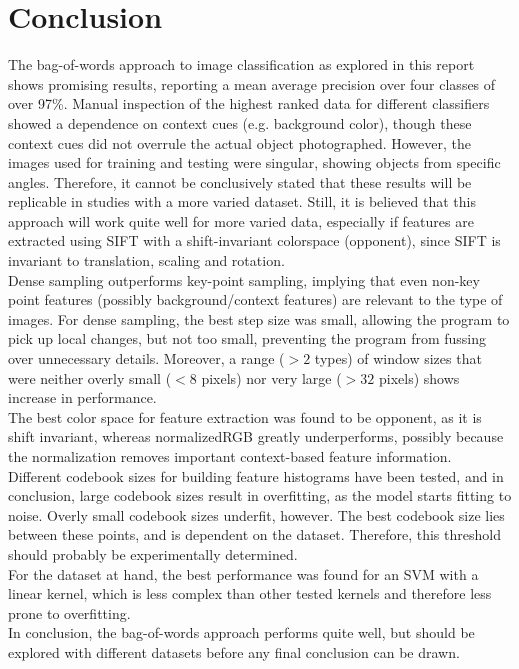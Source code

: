 \documentclass{article} %
\begin{document}
\section{Conclusion}
The bag-of-words approach to image classification as explored in this report shows promising results, reporting a mean average precision over four classes of over 97\%. Manual inspection of the highest ranked data for different classifiers showed a dependence on context cues (e.g. background color), though these context cues did not overrule the actual object photographed. However, the images used for training and testing were singular, showing objects from specific angles. Therefore, it cannot be conclusively stated that these results will be replicable in studies with a more varied dataset. Still, it is believed that this approach will work quite well for more varied data, especially if features are extracted using SIFT with a shift-invariant colorspace (opponent), since SIFT is invariant to translation, scaling and rotation. \\
Dense sampling outperforms key-point sampling, implying that even non-key point features (possibly background/context features) are relevant to the type of images. For dense sampling, the best step size was small, allowing the program to pick up local changes, but not too small, preventing the program from fussing over unnecessary details. Moreover, a range ($>2$ types) of window sizes that were neither overly small ($<$8 pixels) nor very large ($>32$ pixels) shows increase in performance. \\
The best color space for feature extraction was found to be opponent, as it is shift invariant, whereas normalizedRGB greatly underperforms, possibly because the normalization removes important context-based feature information. \\
Different codebook sizes for building feature histograms have been tested, and in conclusion, large codebook sizes result in overfitting, as the model starts fitting to noise. Overly small codebook sizes underfit, however. The best codebook size lies between these points, and is dependent on the dataset. Therefore, this threshold should probably be experimentally determined. \\
For the dataset at hand, the best performance was found for an SVM with a linear kernel, which is less complex than other tested kernels and therefore less prone to overfitting. \\
In conclusion, the bag-of-words approach performs quite well, but should be explored with different datasets before any final conclusion can be drawn.
\end{document}
